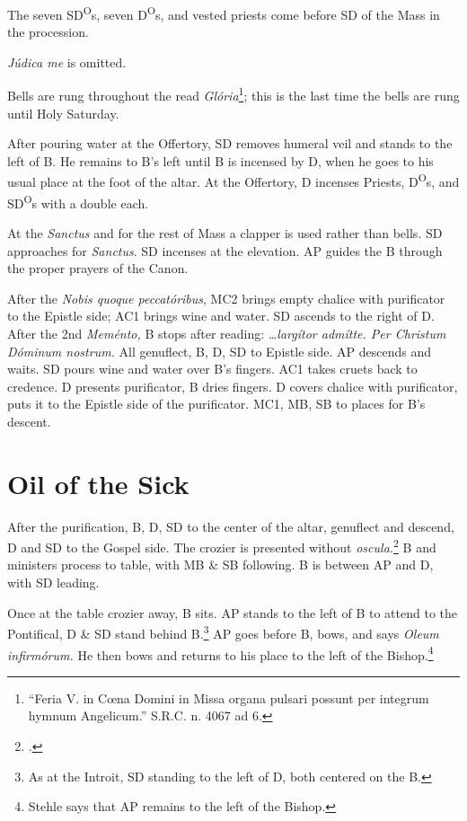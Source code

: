 \documentclass{report}
\begin{document}
\begin{multicols}{2}
\rubric The seven SD\textsuperscript{O}s, seven D\textsuperscript{O}s, and
    vested priests come before SD of the Mass in the procession.

    \rubric \textit{Júdica me} is omitted.

    \rubric Bells are rung throughout the read \textit{Glória}\footnote{``Feria
    V. in C\oe na Domini in Missa organa pulsari possunt per integrum hymnum
    Angelicum.'' S.R.C. n. 4067 ad 6.}; this is the last time the bells are
    rung until Holy Saturday.

    \rubric After pouring water at the Offertory, SD removes humeral veil and
    stands to the left of B. He remains to B's left until B is incensed by D,
    when he goes to his usual place at the foot of the altar. At the Offertory,
    D incenses Priests, D\textsuperscript{O}s, and SD\textsuperscript{O}s with
    a double each.

    \rubric At the \textit{Sanctus} and for the rest of Mass a clapper is used
    rather than bells. SD approaches for \textit{Sanctus}. SD incenses at the
    elevation. AP guides the B through the proper prayers of the Canon.

    \rubric After the \textit{Nobis quoque peccatóribus}, MC2 brings empty
    chalice with purificator to the Epistle side; AC1 brings wine and water. SD
    ascends to the right of D. After the 2nd \textit{Meménto,} B stops after
    reading: \textit{\dots largítor admítte. Per Christum Dóminum nostrum.} All
    genuflect, B, D, SD to Epistle side. AP descends and waits. SD pours wine
    and water over B's fingers. AC1 takes cruets back to credence. D presents
    purificator, B dries fingers. D covers chalice with purificator, puts it to
    the Epistle side of the purificator. MC1, MB, SB to places for B's descent.

    \section{Oil of the Sick}

    \rubric After the purification, B, D, SD to the center of the altar,
    genuflect and descend, D and SD to the Gospel side. The crozier is
    presented without \textit{oscula.}\footcite[184]{stehle} B and ministers
    process to table, with MB \& SB following. B is between AP and D, with SD
    leading.

    \rubric Once at the table crozier away, B sits. AP stands to the left of B
    to attend to the Pontifical, D \& SD stand behind B.\footnote{As at the
    Introit, SD standing to the left of D, both centered on the B.} AP goes
    before B, bows, and says \textit{Oleum infirmórum.} He then bows and
    returns to his place to the left of the Bishop.\footnote{Stehle says that
    AP remains to the left of the Bishop.}


\end{multicols}
\end{document}
